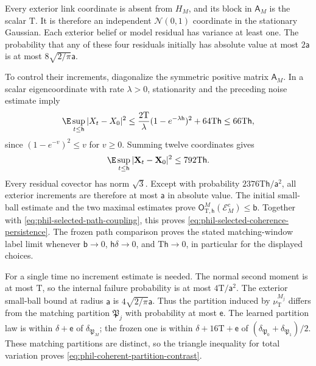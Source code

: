 Every exterior link coordinate is absent from \(H_M\), and its
block in \(\mathsf A_M\) is the scalar \(\mathrm T\).
It is therefore an independent \(\mathcal N(0,1)\) coordinate in
the stationary Gaussian. Each exterior belief or model residual
has variance at least one. The probability that any of these four
residuals initially has absolute value at most \(2\mathsf a\)
is at most \(8\sqrt{2/\pi}\mathsf a\).

To control their increments, diagonalize the symmetric positive
matrix \(\mathsf A_M\). In a scalar eigencoordinate with rate
\(\lambda>0\), stationarity and the preceding noise estimate imply
\[
 \E\sup_{t\le\mathsf h}|X_t-X_0|^2
 \le\frac{2\mathrm T}{\lambda}(1-e^{-\lambda\mathsf h})^2
                       +64\mathrm T\mathsf h
 \le66\mathrm T\mathsf h,
\]
since \((1-e^{-v})^2\le v\) for \(v\ge0\).
Summing twelve coordinates gives
\begin{equation}
 \E\sup_{t\le\mathsf h}|\mathbf X_t-\mathbf X_0|^2
 \le792\mathrm T\mathsf h.
 \label{eq:phil-selected-ou-increments}
\end{equation}
Every residual covector has norm \(\sqrt3\). Except with
probability \(2376\mathrm T\mathsf h/\mathsf a^2\), all exterior
increments are therefore at most \(\mathsf a\) in absolute value.
The initial small-ball estimate and the two maximal estimates prove
\(\mathsf O_{\mathrm T,\mathsf h}^M(\mathscr E_M^c)\le\mathsf b\).
Together with \cref{eq:phil-selected-path-coupling}, this proves
\cref{eq:phil-selected-coherence-persistence}.
The frozen path comparison proves the stated matching-window label
limit whenever \(\mathsf b\to0\),
\(\mathsf h\delta\to0\), and \(\mathrm T\mathsf h\to0\), in
particular for the displayed choices.

For a single time no increment estimate is needed. The normal second
moment is at most \(\mathrm T\), so the internal failure probability
is at most \(4\mathrm T/\mathsf a^2\). The exterior small-ball
bound at radius \(\mathsf a\) is
\(4\sqrt{2/\pi}\mathsf a\). Thus the partition induced by
\(\nu_{\mathrm T}^{M_j}\) differs from the matching partition
\(\mathfrak P_j\) with probability at most \(\mathsf e\).
The learned partition law is within \(\delta+\mathsf e\) of
\(\delta_{\mathfrak P_M}\); the frozen one is within
\(\delta+16\mathrm T+\mathsf e\) of
\((\delta_{\mathfrak P_0}+\delta_{\mathfrak P_1})/2\).
These matching partitions are distinct, so the triangle inequality
for total variation proves \cref{eq:phil-coherent-partition-contrast}.


